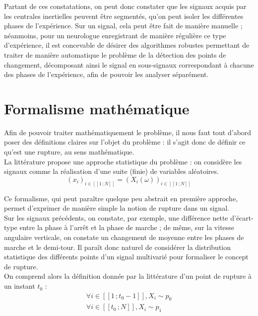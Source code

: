 \documentclass[french,11pt,notitlepage]{report}
\begin{document}
	\vspace{1pc}
	
	Partant de ces constatations, on peut donc constater que les signaux acquis par les centrales inertielles peuvent être segmentés,
	qu'on peut isoler les différentes phases de l'expérience.
	Sur un signal, cela peut être fait de manière manuelle ;
	néanmoins,
	pour un neurologue enregistrant de manière régulière ce type d'expérience,
	il est concevable de désirer des algorithmes robustes permettant de traiter de manière automatique le problème de la détection des points de changement,
	décomposant ainsi le signal en sous-signaux correspondant à chacune des phases de l'expérience, afin de pouvoir les analyser séparément.
	
	
	\section{Formalisme mathématique}
	
	
	Afin de pouvoir traiter mathématiquement le problème,
	il nous faut tout d'abord poser des définitions claires sur l'objet du problème :
	il s'agit donc de définir ce qu'est une rupture,
	au sens mathématique.
	\\
	
	La littérature propose une approche statistique du problème : 
	on considère les signaux comme la réalisation d'une suite (finie) de variables aléatoires.
	\begin{equation}
		(x_i)_{i \in [\![1\,; N]\!]} = (X_i(\omega))_{i \in [\![1\,; N]\!]}
		\label{11}
	\end{equation}
	
	Ce formalisme,
	qui peut paraître quelque peu abstrait en première approche,
	permet d'exprimer de manière simple la notion de rupture dans un signal.
	\\
	
	Sur les signaux précédents, on constate, par exemple,
	une différence nette d'écart-type entre la phase à l'arrêt et la phase de marche ;
	de même, sur la vitesse angulaire verticale, on constate un changement de moyenne entre les phases de marche et le demi-tour.
	Il paraît donc naturel de considérer la distribution statistique des différents points d'un signal multivarié pour formaliser le concept de rupture.
	\\
	
	On comprend alors la définition donnée par la littérature d'un point de rupture à un instant $t_0$ :
	\begin{equation}
	\begin{array}{ll}
			\forall i \in [\![1\,; t_0-1]\!], X_i \sim p_0 \\
			 \forall i \in [\![t_0\,; N]\!], X_i \sim p_1 \\
	\end{array}
	\end{equation}
	
\end{document}
